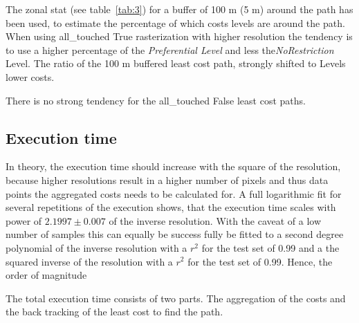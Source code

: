 The zonal stat (see table~\ref{tab:3}) for a buffer of 100 m (5 m) around the path has been used, to estimate the
percentage of which costs levels are around the path.
When using all\_touched True rasterization with higher resolution the tendency is to use a higher percentage of the
\textit{Preferential Level} and less the\textit{NoRestriction} Level.
The ratio of the 100 m buffered least cost path, strongly shifted  to Levels lower costs.

There is no strong tendency for the all\_touched False least cost paths.

\subsection{Execution time}\label{subsec:execution-time}

In theory, the execution time should increase with the square of the resolution, because higher resolutions result in a higher number of pixels and thus data points the aggregated costs needs to be calculated for. 
A full logarithmic fit for several repetitions of the execution shows, that the execution time scales with power of $2.1997  \pm 0.007$ of the inverse resolution. 
With the caveat of a low number of samples this can equally be success fully be fitted to a second degree polynomial of the inverse resolution with a $r^2$ for the test set of 0.99 and a the squared inverse of the resolution with a $r^2$ for the test set of 0.99.
Hence, the order of magnitude

The total execution time consists of two parts. 
The aggregation of the costs and the back tracking of the least cost to find the path.

\setlength{\tabcolsep}{10pt}

